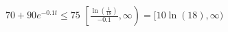 {$70 + 90e^{-0.1t} \leq 75$ \label{expineqlast}}
{$\left[\frac{\ln\left(\frac{1}{18}\right)}{-0.1}, \infty\right) = [10\ln(18), \infty)$}